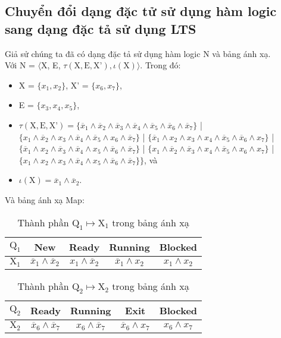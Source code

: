 \documentclass[a4paper,13pt,oneside,openany]{book}
\begin{document}
\begin{flushleft}
	\section{Chuyển đổi dạng đặc tử sử dụng hàm logic sang dạng đặc tả sử dụng LTS}
	Giả sử chúng ta đã có dạng đặc tả sử dụng hàm logic N và bảng ánh xạ.\\
	Với N = $\langle$X, E, $\tau(\textrm{X}, \textrm{E}, \textrm{X'}), \iota(\textrm{X})\rangle$. Trong đó:
	\begin{itemize}
		\item X = $\{x_1, x_2\}$, X' = $\{x_6, x_7\}$,
		\item E = $\{x_3, x_4, x_5\}$,
		\item $\tau(\textrm{X}, \textrm{E}, \textrm{X'}) = \{\overline{x}_1 \land \overline{x}_2 \land \overline{x}_3 \land \overline{x}_4 \land \overline{x}_5 \land \overline{x}_6 \land \overline{x}_7\}$ | $\{x_1 \land \overline{x}_2 \land x_3 \land \overline{x}_4 \land \overline{x}_5 \land x_6 \land \overline{x}_7\}$ | $\{\overline{x}_1 \land x_2 \land x_3 \land x_4 \land \overline{x}_5 \land \overline{x}_6 \land x_7\}$ | $\{\overline{x}_1 \land x_2 \land \overline{x}_3 \land \overline{x}_4 \land x_5 \land \overline{x}_6 \land \overline{x}_7\}$ | $\{x_1 \land \overline{x}_2 \land \overline{x}_3 \land x_4 \land \overline{x}_5 \land x_6 \land x_7\}$ | $\{x_1 \land x_2 \land x_3 \land \overline{x}_4 \land x_5 \land \overline{x}_6 \land \overline{x}_7\}\}$, và
		\item $\iota(\textrm{X}) = \overline{x}_1 \land \overline{x}_2$.
	\end{itemize}
	Và bảng ánh xạ Map:
	\begin{table}[!ht]
		\centering
		\renewcommand{\arraystretch}{1.25}
		\begin{tabular}{|c|c|c|c|c|}
			\hline
			$\textrm{Q}_1$ & New & Ready & Running & Blocked\\
			\hline
			$\textrm{X}_1$ & $\overline{x}_1 \land \overline{x}_2$ & $x_1\land\overline{x}_2$&$\overline{x}_1\land x_2$ &
			$x_1 \land x_2$\\
			\hline
		\end{tabular}
		\caption{Thành phần $\textrm{Q}_1 \mapsto \textrm{X}_1$ trong bảng ánh xạ}
	\end{table}

	\begin{table}[!ht]
		\centering
		\renewcommand{\arraystretch}{1.25}
		\begin{tabular}{|c|c|c|c|c|}
			\hline
			$\textrm{Q}_2$ & Ready & Running & Exit & Blocked\\
			\hline
			$\textrm{X}_2$ & $\overline{x}_6 \land \overline{x}_7$ & $x_6\land \overline{x}_7$ & $\overline{x}_6\land x_7$ &
			$x_6 \land x_7$\\
			\hline
		\end{tabular}
		\caption{Thành phần $\textrm{Q}_2 \mapsto \textrm{X}_2$ trong bảng ánh xạ}
	\end{table}


\end{flushleft}
\end{document}
